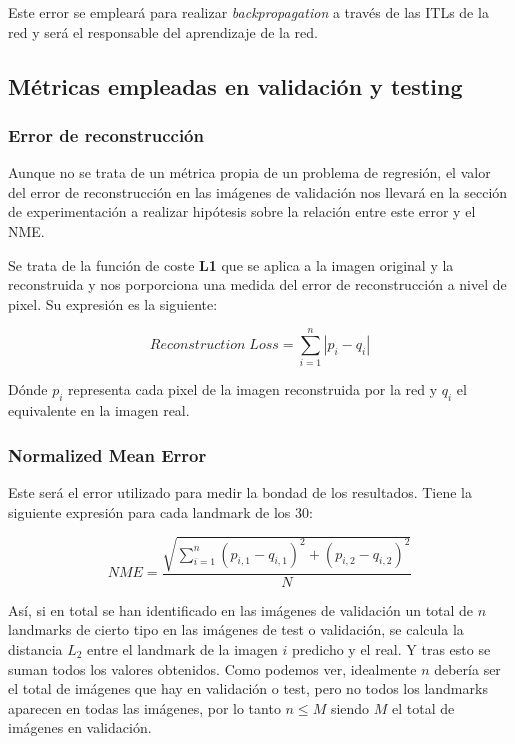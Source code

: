             \noindent Este error se empleará para realizar \textit{backpropagation} a través de las ITLs de la red y será el responsable del aprendizaje de la red.

    \subsection{Métricas empleadas en validación y testing}

        \subsubsection{Error de reconstrucción}
            \noindent Aunque no se trata de un métrica propia de un problema de regresión, el valor del error de reconstrucción en las imágenes de validación nos llevará en la sección de experimentación a realizar hipótesis sobre la relación entre este error y el NME.

            \medskip

            \noindent Se trata de la función de coste \textbf{L1} que se aplica a la imagen original y la reconstruida  y nos porporciona una medida del error de reconstrucción a nivel de pixel. Su expresión es la siguiente:

            \begin{equation}
                Reconstruction \; Loss = \sum_{i=1}^n |p_i -q_i|
            \end{equation}

            \noindent Dónde $p_i$ representa cada pixel de la imagen reconstruida por la red y $q_i$ el equivalente en la imagen real.

        \subsubsection{Normalized Mean Error}
            \noindent Este será el error utilizado para medir la bondad de los resultados. Tiene la siguiente expresión para cada landmark de los $30$: 

            \begin{equation}
                NME=\frac{\sqrt{\sum_{i=1}^{n}(p_{i,1} -q_{i,1})^2+ (p_{i,2} -q_{i,2})^2}}{N}
            \end{equation}


            \noindent Así, si en total se han identificado en las imágenes de validación un total de $n$ landmarks de cierto tipo en las imágenes de test o validación, se calcula la distancia $L_2$ entre el landmark de la imagen $i$ predicho y el real. Y tras esto se suman todos los valores obtenidos. Como podemos ver, idealmente $n$ debería ser el total de imágenes que hay en validación o test, pero no todos los landmarks aparecen en todas las imágenes, por lo tanto $n\leq M$ siendo $M$ el total de imágenes en validación.

